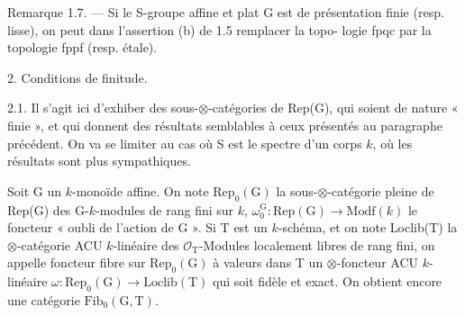 Remarque 1.7. --- Si le S-groupe affine et plat G est de présentation
finie (resp. lisse), on peut dans l'assertion (b) de 1.5 remplacer la topo-%
logie fpqc par la topologie fppf (resp. étale).

2. Conditions de finitude.

2.1. Il s'agit ici d'exhiber des sous-$\otimes$-catégories de Rep(G), qui soient
de nature « finie », et qui donnent des résultats semblables à ceux présentés
au paragraphe précédent. On va se limiter au cas où S est le spectre d'un
corps $k$, où les résultats sont plus sympathiques.

Soit G un $k$-monoïde affine. On note $\mathrm{Rep}_0(\mathrm{G})$ la sous-$\otimes$-catégorie pleine
de Rep(G) des G-$k$-modules de rang fini sur $k$, $\omega_0^{\mathrm{G}}:\mathrm{Rep}(\mathrm{G})\to\mathrm{Modf}(k)$
le foncteur « oubli de l'action de G ». Si T est un $k$-schéma, et on note
Loclib(T) la $\otimes$-catégorie ACU $k$-linéaire des $\mathcal{O}_{\mathrm{T}}$-Modules localement libres
de rang fini, on appelle foncteur fibre sur $\mathrm{Rep}_0(\mathrm{G})$ à valeurs dans T un
$\otimes$-foncteur ACU $k$-linéaire $\omega:\mathrm{Rep}_0(\mathrm{G})\to\mathrm{Loclib}(\mathrm{T})$ qui soit fidèle et
exact. On obtient encore une catégorie $\mathrm{Fib}_0(\mathrm{G},\mathrm{T})$.


